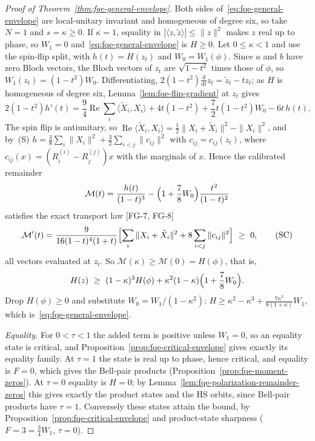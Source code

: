 \begin{proof}[Proof of Theorem~\ref{thm:fqe-general-envelope}]
Both sides of~\eqref{eq:fqe-general-envelope} are local-unitary invariant and homogeneous of degree six, so take $N=1$ and
$s=\kappa\ge0$. If $\kappa=1$, equality in $|\langle z,\tilde z\rangle|\le\|z\|^2$ makes $z$ real up to phase, so $W_1=0$
and~\eqref{eq:fqe-general-envelope} is $H\ge0$. Let $0\le\kappa<1$ and use the spin-flip split, with $h(t)=H(z_t)$ and
$W_0=W_1(\phi)$. Since $a$ and $b$ have zero Bloch vectors, the Bloch vectors of $z_t$ are $\sqrt{1-t^2}$ times those of
$\phi$, so $W_1(z_t)=(1-t^2)W_0$. Differentiating, $2(1-t^2)\frac{d}{dt}z_t=\tilde z_t-tz_t$; as $H$ is homogeneous of degree
six, Lemma~\ref{lem:fqe-flip-gradient} at $z_t$ gives
\[
 2(1-t^2)h'(t)=\frac94\operatorname{Re}\sum_i\langle\tilde X_i,X_i\rangle+4t(1-t^2)+\frac72t(1-t^2)W_0-6t\,h(t).
\]
The spin flip is antiunitary, so $\operatorname{Re}\langle\tilde X_i,X_i\rangle=\frac12\|X_i+\tilde X_i\|^2-\|X_i\|^2$, and
by~(S) $h=\frac38\sum_i\|X_i\|^2+\frac32\sum_{i<j}\|c_{ij}\|^2$ with $c_{ij}=c_{ij}(z_t)$, where $c_{ij}(x)=(R_i^{(i)}-R_j^{(j)})x$ with the marginals of $x$. Hence the calibrated
remainder
\[
 \mathcal M(t)=\frac{h(t)}{(1-t)^3}-\Bigl(1+\frac78W_0\Bigr)\frac{t^2}{(1-t)^2}
\]
satisfies the exact transport law [FG-7, FG-8]
\[
 \mathcal M'(t)=\frac{9}{16(1-t)^4(1+t)}
 \Bigl[\sum_i\|X_i+\tilde X_i\|^2+8\sum_{i<j}\|c_{ij}\|^2\Bigr]\ \ge\ 0,
 \tag{SC}\label{eq:fqe-spin-flip-calibration}
\]
all vectors evaluated at $z_t$. So $\mathcal M(\kappa)\ge\mathcal M(0)=H(\phi)$, that is,
\[
 H(z)\ \ge\ (1-\kappa)^3H(\phi)+\kappa^2(1-\kappa)\Bigl(1+\frac78W_0\Bigr).
\]
Drop $H(\phi)\ge0$ and substitute $W_0=W_1/(1-\kappa^2)$: $H\ge\kappa^2-\kappa^3+\frac{7\kappa^2}{8(1+\kappa)}W_1$,
which is~\eqref{eq:fqe-general-envelope}.

\emph{Equality.} For $0<\tau<1$ the added term is positive unless $W_1=0$, so an equality state is critical, and
Proposition~\ref{prop:fqe-critical-envelope} gives exactly its equality family. At $\tau=1$ the state is real up to phase,
hence critical, and equality is $F=0$, which gives the Bell-pair products (Proposition~\ref{prop:fqe-moment-zeros}). At
$\tau=0$ equality is $H=0$; by Lemma~\ref{lem:fqe-polarization-remainder-zeros} this gives exactly the product states and the
HS orbits, since Bell-pair products have $\tau=1$. Conversely these states attain the bound, by
Proposition~\ref{prop:fqe-critical-envelope} and product-state sharpness ($F=3=\frac34W_1$, $\tau=0$).
\end{proof}


